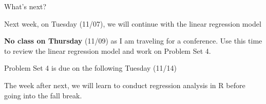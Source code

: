 \documentclass{./../div_teaching_slides}
\begin{document}
\begin{frame}{What's next?}
\begin{witemize}
  \item Next week, on Tuesday (11/07), we will continue with the linear regression model
  \item \textbf{No class on Thursday} (11/09) as I am traveling for a conference. Use this time to review the linear regression model and work on Problem Set 4.
  \item Problem Set 4 is due on the following Tuesday (11/14)
  \item The week after next, we will learn to conduct regression analysis in R before going into the fall break. 
\end{witemize}
\end{frame}
\end{document}
